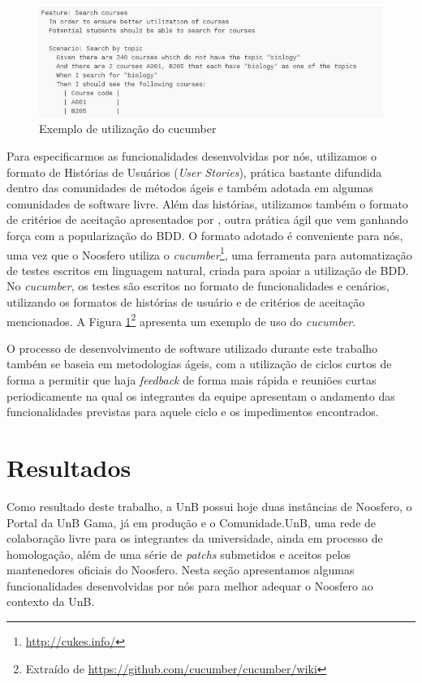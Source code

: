 \documentclass[12pt]{article}
\begin{document}
\begin{figure}[h]
	\centering
	\includegraphics[keepaspectratio=true,scale=0.6]{images/cucumber-sample.png}
	\caption{Exemplo de utilização do cucumber}
	\label{cucumber}
\end{figure}

Para especificarmos as funcionalidades desenvolvidas por nós, utilizamos
o formato de Histórias de Usuários (\textit{User Stories}),
prática bastante difundida dentro das comunidades de métodos ágeis e também
adotada em algumas comunidades de software livre.
%
Além das histórias, utilizamos também o formato de critérios de aceitação
apresentados por , outra
prática ágil que vem ganhando força com a popularização do BDD.
%
O formato adotado é conveniente para nós, uma vez que o Noosfero utiliza o
\textit{cucumber}\footnote{\url{http://cukes.info/}}, uma ferramenta para
automatização de testes escritos em linguagem natural, criada para apoiar a
utilização de BDD. No \textit{cucumber}, os testes são escritos no formato
de funcionalidades e cenários, utilizando os formatos de histórias de
usuário e de critérios de aceitação mencionados. A Figura
\ref{cucumber}\footnote{Extraído de \url{https://github.com/cucumber/cucumber/wiki}}
apresenta um exemplo de uso do \textit{cucumber}.

O processo de desenvolvimento de software utilizado durante este trabalho
também se baseia em metodologias ágeis, com a utilização de ciclos curtos de
forma a permitir que haja \textit{feedback} de forma mais rápida e reuniões
curtas periodicamente na qual os integrantes da equipe apresentam o andamento
das funcionalidades previstas para aquele ciclo e os impedimentos encontrados.

\section{Resultados} \label{sec:resultados}

Como resultado deste trabalho, a UnB possui hoje duas instâncias de Noosfero,
o Portal da UnB Gama, já em produção e o Comunidade.UnB, uma rede de colaboração
livre para os integrantes da universidade, ainda em processo de homologação,
além de uma série de \textit{patchs} submetidos e aceitos pelos mantenedores
oficiais do Noosfero. Nesta seção apresentamos algumas funcionalidades
desenvolvidas por nós para melhor adequar o Noosfero ao contexto da UnB.
\end{document}
